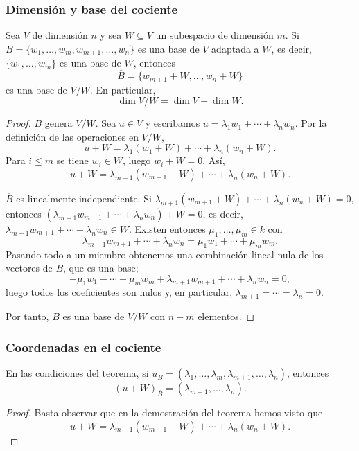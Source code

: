 \begin{frame}[allowframebreaks, t]
    \frametitle{Dimensión y base del cociente}

    \begin{theorem}
        Sea $V$ de dimensión $n$ y sea $W\subseteq V$ un subespacio de
        dimensión $m$. Si $B=\{w_1,\ldots,w_m,w_{m+1},\ldots,w_n\}$ es una base de $V$ adaptada
        a $W$, es decir, $\{w_1,\ldots,w_m\}$ es una base de $W$, entonces
        \[
            \overline{B}=\{w_{m+1}+W,\ldots,w_n+W\}
        \]
        es una base de $V/W$. En particular,
        \[
            \dim V/W=\dim V-\dim W.
        \]
    \end{theorem}

    \framebreak

    \begin{proof}
        \alert{$\overline{B}$ genera $V/W$.} Sea $u\in V$ y escribamos
        $u=\lambda_1w_1+\cdots+\lambda_nw_n$. Por la definición de las
        operaciones en $V/W$,
        \[
            u+W=\lambda_1(w_1+W)+\cdots+\lambda_n(w_n+W).
        \]
        Para $i\leq m$ se tiene $w_i\in W$, luego $w_i+W=0$. Así,
        \[
            u+W=\lambda_{m+1}(w_{m+1}+W)+\cdots+\lambda_n(w_n+W).
        \]

        \framebreak

        \alert{$\overline{B}$ es linealmente independiente.} Si
        $\lambda_{m+1}(w_{m+1}+W)+\cdots+\lambda_n(w_n+W)=0$, entonces
        $(\lambda_{m+1}w_{m+1}+\cdots+\lambda_nw_n)+W=0$, es decir,
        $\lambda_{m+1}w_{m+1}+\cdots+\lambda_nw_n\in W$. Existen entonces
        $\mu_1,\ldots,\mu_m\in k$ con
        \[
            \lambda_{m+1}w_{m+1}+\cdots+\lambda_nw_n=\mu_1w_1+\cdots+\mu_mw_m.
        \]
        Pasando todo a un miembro obtenemos una combinación lineal nula de
        los vectores de $B$, que es una base; 
        \[
            -\mu_1w_1-\cdots-\mu_mw_m+\lambda_{m+1}w_{m+1}+\cdots+\lambda_nw_n=0,
        \]
        luego todos los coeficientes
        son nulos y, en particular, $\lambda_{m+1}=\cdots=\lambda_n=0$.

        \medskip

        Por tanto, $\overline{B}$ es una base de $V/W$ con $n-m$ elementos.
    \end{proof}
\end{frame}


\begin{frame}
    \frametitle{Coordenadas en el cociente}

    \begin{corollary}
        En las condiciones del teorema, si
        $u_B=(\lambda_1,\ldots,\lambda_m,\lambda_{m+1},\ldots,\lambda_n)$, entonces
        \[
            (u+W)_{\overline{B}}=(\lambda_{m+1},\ldots,\lambda_n).
        \]
    \end{corollary}

    \begin{proof}
        Basta observar que en la demostración del teorema hemos visto que
        \[u+W=\lambda_{m+1}(w_{m+1}+W)+\cdots+\lambda_n(w_n+W).\]
    \end{proof}
\end{frame}



